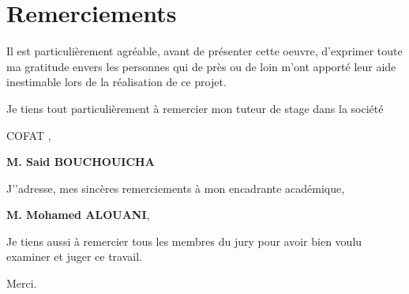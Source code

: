 \chapter*{\huge Remerciements}

\begin{center}
\it \Large

Il est particulièrement agréable, avant de présenter cette oeuvre, d’exprimer toute ma gratitude envers les personnes qui de près ou de loin m’ont apporté leur aide inestimable lors de la réalisation de ce projet.

Je tiens tout particulièrement à remercier mon tuteur de stage dans la société
\begin{center}
   COFAT  , 
\end{center}

\begin{center}
\textbf{M. Said BOUCHOUICHA}
\end{center}


J’'adresse, mes sincères remerciements à mon encadrante académique,



\begin{center}
\textbf{M. Mohamed ALOUANI},
\end{center}



Je tiens aussi à remercier tous les membres du jury pour avoir bien voulu examiner et juger ce travail.


Merci.
    
    
    
    
    
    
\end{center}